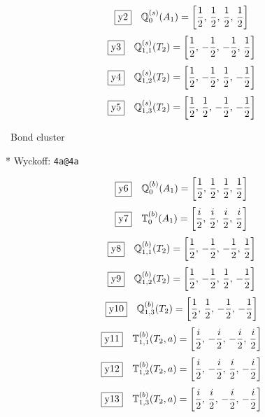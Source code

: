 \documentclass[fleqn,10pt,landscape]{jsarticle}
\begin{document}
\begin{dmath*}
\fbox{y2}\quad \mathbb{Q}_{0}^{(s)}(A_{1})=\left[ \frac{1}{2},\, \frac{1}{2},\, \frac{1}{2},\, \frac{1}{2} \right]
\end{dmath*}
\begin{dmath*}
\fbox{y3}\quad \mathbb{Q}_{1,1}^{(s)}(T_{2})=\left[ \frac{1}{2},\, - \frac{1}{2},\, - \frac{1}{2},\, \frac{1}{2} \right]
\end{dmath*}
\begin{dmath*}
\fbox{y4}\quad \mathbb{Q}_{1,2}^{(s)}(T_{2})=\left[ \frac{1}{2},\, - \frac{1}{2},\, \frac{1}{2},\, - \frac{1}{2} \right]
\end{dmath*}
\begin{dmath*}
\fbox{y5}\quad \mathbb{Q}_{1,3}^{(s)}(T_{2})=\left[ \frac{1}{2},\, \frac{1}{2},\, - \frac{1}{2},\, - \frac{1}{2} \right]
\end{dmath*}
\vspace{5mm}

\noindent\textbullet\, Bond cluster

\vspace{5mm}

\noindent ** Wyckoff: \texttt{4a@4a}

\begin{dmath*}
\fbox{y6}\quad \mathbb{Q}_{0}^{(b)}(A_{1})=\left[ \frac{1}{2},\, \frac{1}{2},\, \frac{1}{2},\, \frac{1}{2} \right]
\end{dmath*}
\begin{dmath*}
\fbox{y7}\quad \mathbb{T}_{0}^{(b)}(A_{1})=\left[ \frac{i}{2},\, \frac{i}{2},\, \frac{i}{2},\, \frac{i}{2} \right]
\end{dmath*}
\begin{dmath*}
\fbox{y8}\quad \mathbb{Q}_{1,1}^{(b)}(T_{2})=\left[ \frac{1}{2},\, - \frac{1}{2},\, - \frac{1}{2},\, \frac{1}{2} \right]
\end{dmath*}
\begin{dmath*}
\fbox{y9}\quad \mathbb{Q}_{1,2}^{(b)}(T_{2})=\left[ \frac{1}{2},\, - \frac{1}{2},\, \frac{1}{2},\, - \frac{1}{2} \right]
\end{dmath*}
\begin{dmath*}
\fbox{y10}\quad \mathbb{Q}_{1,3}^{(b)}(T_{2})=\left[ \frac{1}{2},\, \frac{1}{2},\, - \frac{1}{2},\, - \frac{1}{2} \right]
\end{dmath*}
\begin{dmath*}
\fbox{y11}\quad \mathbb{T}_{1,1}^{(b)}(T_{2},a)=\left[ \frac{i}{2},\, - \frac{i}{2},\, - \frac{i}{2},\, \frac{i}{2} \right]
\end{dmath*}
\begin{dmath*}
\fbox{y12}\quad \mathbb{T}_{1,2}^{(b)}(T_{2},a)=\left[ \frac{i}{2},\, - \frac{i}{2},\, \frac{i}{2},\, - \frac{i}{2} \right]
\end{dmath*}
\begin{dmath*}
\fbox{y13}\quad \mathbb{T}_{1,3}^{(b)}(T_{2},a)=\left[ \frac{i}{2},\, \frac{i}{2},\, - \frac{i}{2},\, - \frac{i}{2} \right]
\end{dmath*}
\vspace{5mm}
\end{document}
